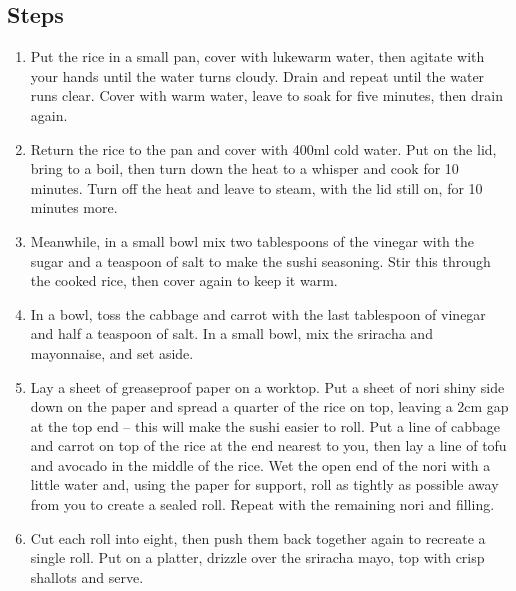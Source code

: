 \documentclass{book}
\begin{document}
\subsection*{Steps}
\begin{enumerate}
\item Put the rice in a small pan, cover with lukewarm water, then agitate with your hands until the water turns cloudy. Drain and repeat until the water runs clear. Cover with warm water, leave to soak for five minutes, then drain again.
\item Return the rice to the pan and cover with 400ml cold water. Put on the lid, bring to a boil, then turn down the heat to a whisper and cook for 10 minutes. Turn off the heat and leave to steam, with the lid still on, for 10 minutes more.
\item Meanwhile, in a small bowl mix two tablespoons of the vinegar with the sugar and a teaspoon of salt to make the sushi seasoning. Stir this through the cooked rice, then cover again to keep it warm.
\item In a bowl, toss the cabbage and carrot with the last tablespoon of vinegar and half a teaspoon of salt. In a small bowl, mix the sriracha and mayonnaise, and set aside.
\item Lay a sheet of greaseproof paper on a worktop. Put a sheet of nori shiny side down on the paper and spread a quarter of the rice on top, leaving a 2cm gap at the top end – this will make the sushi easier to roll. Put a line of cabbage and carrot on top of the rice at the end nearest to you, then lay a line of tofu and avocado in the middle of the rice. Wet the open end of the nori with a little water and, using the paper for support, roll as tightly as possible away from you to create a sealed roll. Repeat with the remaining nori and filling.
\item Cut each roll into eight, then push them back together again to recreate a single roll. Put on a platter, drizzle over the sriracha mayo, top with crisp shallots and serve.
\end{enumerate}
\newpage
\end{document}

